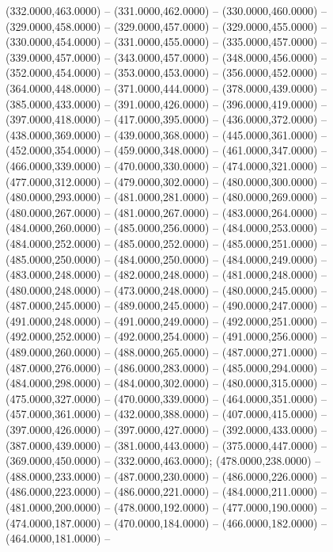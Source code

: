 \begin{scope}[draw=black,fill=c2b83ba,line join=round,line width=0.208pt]
   (332.0000,463.0000) -- (331.0000,462.0000) --
    (330.0000,460.0000) -- (329.0000,458.0000) -- (329.0000,457.0000) --
    (329.0000,455.0000) -- (330.0000,454.0000) -- (331.0000,455.0000) --
    (335.0000,457.0000) -- (339.0000,457.0000) -- (343.0000,457.0000) --
    (348.0000,456.0000) -- (352.0000,454.0000) -- (353.0000,453.0000) --
    (356.0000,452.0000) -- (364.0000,448.0000) -- (371.0000,444.0000) --
    (378.0000,439.0000) -- (385.0000,433.0000) -- (391.0000,426.0000) --
    (396.0000,419.0000) -- (397.0000,418.0000) -- (417.0000,395.0000) --
    (436.0000,372.0000) -- (438.0000,369.0000) -- (439.0000,368.0000) --
    (445.0000,361.0000) -- (452.0000,354.0000) -- (459.0000,348.0000) --
    (461.0000,347.0000) -- (466.0000,339.0000) -- (470.0000,330.0000) --
    (474.0000,321.0000) -- (477.0000,312.0000) -- (479.0000,302.0000) --
    (480.0000,300.0000) -- (480.0000,293.0000) -- (481.0000,281.0000) --
    (480.0000,269.0000) -- (480.0000,267.0000) -- (481.0000,267.0000) --
    (483.0000,264.0000) -- (484.0000,260.0000) -- (485.0000,256.0000) --
    (484.0000,253.0000) -- (484.0000,252.0000) -- (485.0000,252.0000) --
    (485.0000,251.0000) -- (485.0000,250.0000) -- (484.0000,250.0000) --
    (484.0000,249.0000) -- (483.0000,248.0000) -- (482.0000,248.0000) --
    (481.0000,248.0000) -- (480.0000,248.0000) -- (473.0000,248.0000) --
    (480.0000,245.0000) -- (487.0000,245.0000) -- (489.0000,245.0000) --
    (490.0000,247.0000) -- (491.0000,248.0000) -- (491.0000,249.0000) --
    (492.0000,251.0000) -- (492.0000,252.0000) -- (492.0000,254.0000) --
    (491.0000,256.0000) -- (489.0000,260.0000) -- (488.0000,265.0000) --
    (487.0000,271.0000) -- (487.0000,276.0000) -- (486.0000,283.0000) --
    (485.0000,294.0000) -- (484.0000,298.0000) -- (484.0000,302.0000) --
    (480.0000,315.0000) -- (475.0000,327.0000) -- (470.0000,339.0000) --
    (464.0000,351.0000) -- (457.0000,361.0000) -- (432.0000,388.0000) --
    (407.0000,415.0000) -- (397.0000,426.0000) -- (397.0000,427.0000) --
    (392.0000,433.0000) -- (387.0000,439.0000) -- (381.0000,443.0000) --
    (375.0000,447.0000) -- (369.0000,450.0000) -- (332.0000,463.0000);
   (478.0000,238.0000) -- (488.0000,233.0000) --
    (487.0000,230.0000) -- (486.0000,226.0000) -- (486.0000,223.0000) --
    (486.0000,221.0000) -- (484.0000,211.0000) -- (481.0000,200.0000) --
    (478.0000,192.0000) -- (477.0000,190.0000) -- (474.0000,187.0000) --
    (470.0000,184.0000) -- (466.0000,182.0000) -- (464.0000,181.0000) --

\end{scope}
